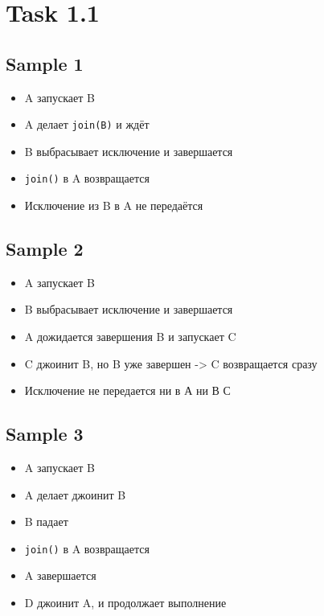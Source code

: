 \documentclass{article}
\begin{document}
\section*{Task 1.1}

\subsection*{Sample 1}

\begin{itemize}
\item A запускает B
\item A делает \texttt{join(B)} и ждёт
\item B выбрасывает исключение и завершается
\item \texttt{join()} в A возвращается
\item Исключение из B в A не передаётся
\end{itemize}

\subsection*{Sample 2}

\begin{itemize}
\item A запускает B
\item B выбрасывает исключение и завершается
\item A дожидается завершения B и запускает C
\item C джоинит B, но B уже завершен -> C возвращается сразу
\item Исключение не передается ни в А ни В С
\end{itemize}

\subsection*{Sample 3}

\begin{itemize}
\item A запускает B
\item A делает джоинит B
\item B падает
\item \texttt{join()} в A возвращается
\item A завершается
\item D джоинит A, и продолжает выполнение
\end{itemize}
\end{document}
